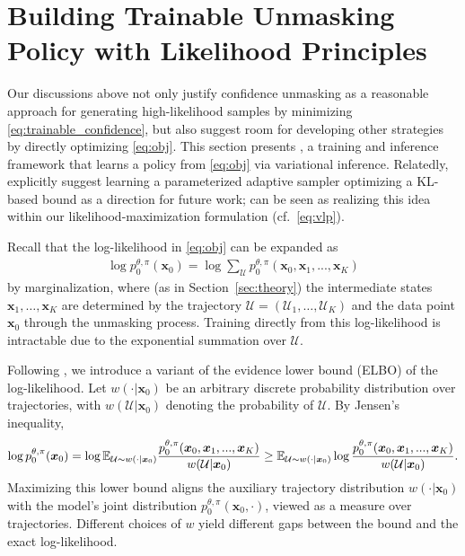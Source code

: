 \section{Building Trainable Unmasking Policy with Likelihood Principles}\label{sec:method}
Our discussions above not only justify confidence unmasking as a reasonable approach for generating high-likelihood samples by minimizing \eqref{eq:trainable_confidence}, but also suggest room for developing other strategies by directly optimizing \eqref{eq:obj}. This section presents \alg{}, a training and inference framework that learns a policy from \eqref{eq:obj} via variational inference. Relatedly, \citet{benhamu2025eb} explicitly suggest learning a parameterized adaptive sampler optimizing a KL-based bound as a direction for future work; \alg{} %
can be seen as realizing this idea within our likelihood-maximization formulation (cf.~\eqref{eq:vlp}).

Recall that the log-likelihood in \eqref{eq:obj} can be expanded as
\begin{align*}
    \log p_0^{\theta,\pi}(\bm x_0) = \log\sum_{\mathcal U} p_0^{\theta,\pi}(\bm x_0, \bm x_1, ..., \bm x_K)
\end{align*}
by marginalization, where (as in Section~\ref{sec:theory}) the intermediate states $\bm x_1, \ldots, \bm x_K$ are determined by the trajectory $\mathcal U=(\mathcal U_1, \ldots, \mathcal U_K)$ and the data point $\bm x_0$ through the unmasking process. Training directly from this log-likelihood is intractable due to the exponential summation over $\mathcal U$.

Following \citet{wang2025learningorder}, we introduce a variant of the evidence lower bound (ELBO) of the log-likelihood. Let $w(\cdot|\bm x_0)$ be an arbitrary discrete probability distribution over trajectories, with $w(\mathcal U|\bm x_0)$ denoting the probability of $\mathcal U$. By Jensen's inequality,
\begin{align}
    \log p_0^{\theta,\pi}(\bm x_0) 
    = \log \mathbb{E}_{\mathcal U \sim w(\cdot|\bm x_0)}\frac{p_0^{\theta,\pi}(\bm x_0, \bm x_1, ..., \bm x_K)}{w(\mathcal U|\bm x_0)}
    \geq \mathbb{E}_{\mathcal U \sim w(\cdot|\bm x_0)}\log\frac{p_0^{\theta,\pi}(\bm x_0, \bm x_1, ..., \bm x_K)}{w(\mathcal U|\bm x_0)}.\label{eq:vlp}
\end{align}
Maximizing this lower bound aligns the auxiliary trajectory distribution $w(\cdot|\bm x_0)$ with the model's joint distribution $p_0^{\theta,\pi}(\bm x_0,\cdot)$, viewed as a measure over trajectories. Different choices of $w$ yield different gaps between the bound and the exact log-likelihood.

